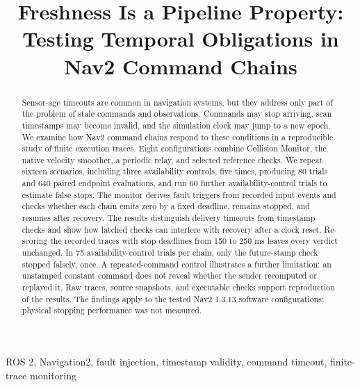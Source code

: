\documentclass[conference]{IEEEtran}
\begin{document}
\title{Freshness Is a Pipeline Property: Testing Temporal Obligations in Nav2 Command Chains}
\author{
}
\maketitle

\begin{abstract}
Sensor-age timeouts are common in navigation systems, but they address only part of the problem of stale commands and observations. Commands may stop arriving, scan timestamps may become invalid, and the simulation clock may jump to a new epoch. We examine how Nav2 command chains respond to these conditions in a reproducible study of finite execution traces. Eight configurations combine Collision Monitor, the native velocity smoother, a periodic relay, and selected reference checks. We repeat sixteen scenarios, including three availability controls, five times, producing 80 trials and 640 paired endpoint evaluations, and run 60 further availability-control trials to estimate false stops. The monitor derives fault triggers from recorded input events and checks whether each chain emits zero by a fixed deadline, remains stopped, and resumes after recovery. The results distinguish delivery timeouts from timestamp checks and show how latched checks can interfere with recovery after a clock reset. Re-scoring the recorded traces with stop deadlines from 150 to 250 ms leaves every verdict unchanged. In 75 availability-control trials per chain, only the future-stamp check stopped falsely, once. A repeated-command control illustrates a further limitation: an unstamped constant command does not reveal whether the sender recomputed or replayed it. Raw traces, source snapshots, and executable checks support reproduction of the results. The findings apply to the tested Nav2 1.3.13 software configurations; physical stopping performance was not measured.
\end{abstract}
\begin{IEEEkeywords}
ROS 2, Navigation2, fault injection, timestamp validity, command timeout, finite-trace monitoring
\end{IEEEkeywords}
\end{document}
